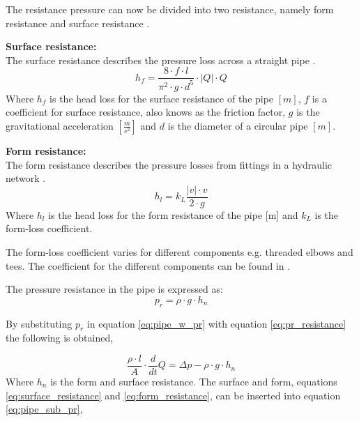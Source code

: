 The resistance pressure can now be divided into two resistance, namely form resistance and surface resistance \cite{swamee_pipe}. 

\textbf{Surface resistance:}\\
The surface resistance describes the pressure loss across a straight pipe \cite{swamee_pipe}.
\begin{equation}\label{eq:surface_resistance}
h_f=\frac{8\cdot f\cdot l}{\pi^2\cdot g\cdot d^5} \cdot |Q|\cdot Q
\end{equation}
Where $h_f$ is the head loss for the surface resistance of the pipe $[m]$, $f$ is a coefficient for surface resistance, also knows as the friction factor, $g$ is the gravitational acceleration $\left[\frac{m}{s^2}\right]$ and $d$ is the diameter of a circular pipe $[m]$.

\textbf{Form resistance:}\\
The form resistance describes the pressure losses from fittings in a hydraulic network \cite{swamee_pipe}. 
\begin{equation} \label{eq:form_resistance}
h_l=k_L \frac{ |v|\cdot v }{2\cdot g}
\end{equation}
Where $h_l$ is the head loss for the form resistance of the pipe [m] and $k_L$ is the form-loss coefficient.

The form-loss coefficient varies for different components e.g. threaded elbows and tees. The coefficient for the different components can be found in \cite{fundamentals_of_fluid_mechanics}. 

The pressure resistance in the pipe is expressed as:
\begin{equation}\label{eq:pr_resistance}
p_r=\rho \cdot g \cdot h_n 
\end{equation}

By substituting $p_r$ in equation \ref{eq:pipe_w_pr} with equation \ref{eq:pr_resistance} the following is obtained,

\begin{equation} \label{eq:pipe_sub_pr}
\frac{\rho \cdot l}{A}\cdot \frac{d}{dt}Q = \Delta p - \rho \cdot g \cdot h_n 
\end{equation}
Where $h_n$ is the form and surface resistance. The surface and form, equations \ref{eq:surface_resistance} and \ref{eq:form_resistance}, can be inserted into equation \ref{eq:pipe_sub_pr},


